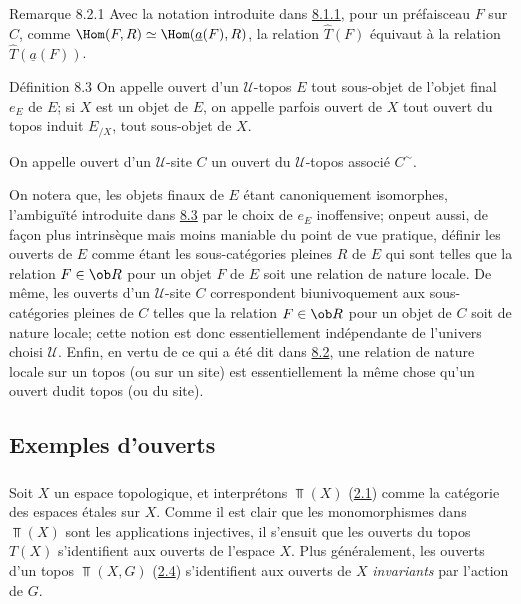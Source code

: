 \begin{enonce*}[remark]{Remarque 8.2.1}
Avec la notation introduite dans \hyperref[IV.rem8.1.1]{8.1.1}, pour un
préfaisceau $F$ sur $C$, comme $\Hom(F,R)\simeq
\Hom(\underline{a}(F),R)$, la relation $\widehat{T}(F)$ équivaut à la
relation $\widehat{T}(\underline{a}(F))$.
\end{enonce*}

\begin{enonce*}{Définition 8.3}
On appelle ouvert d'un $𝒰$-topos $E$ tout sous-objet de
l'objet final $e_E$ de $E$; si $X$ est un objet de $E$, on appelle
parfois ouvert de $X$ tout ouvert du topos induit $E_{/X}$, \ie tout
sous-objet de $X$.

On appelle ouvert d'un $𝒰$-site $C$ un ouvert du
$𝒰$-topos associé $C^{\sim}$.
\end{enonce*}

On notera que, les objets finaux de $E$ étant canoniquement
isomorphes, l'ambiguïté introduite dans \hyperref[IV.def8.3]{8.3} par le choix
de $e_E$ inoffensive; on\pageoriginale peut aussi, de façon plus
intrinsèque mais moins maniable du point de vue pratique, définir
les ouverts de $E$ comme étant les sous-catégories pleines $R$ de
$E$ qui sont telles que la relation $F\in \ob R$ pour un objet $F$
de $E$ soit une relation de nature locale. De même, les ouverts d'un
$𝒰$-site $C$ correspondent biunivoquement aux
sous-catégories pleines de $C$ telles que la relation $F\in \ob R$
pour un objet de $C$ soit de nature locale; cette notion est donc
essentiellement indépendante de l'univers choisi $𝒰$. Enfin,
en vertu de ce qui a été dit dans \hyperref[IV.subsec8.2]{8.2}, une relation
de nature locale sur un topos (ou sur un site) est essentiellement
la même chose qu'un ouvert dudit topos (ou du site).

\setcounter{subsection}{3}
\subsection{Exemples d'ouverts}

\subsubsection{}
Soit $X$ un espace topologique, et interprétons $\Top(X)$
(\hyperref[IV.subsec2.1]{2.1}) comme la catégorie des espaces étales sur $X$.
Comme il est clair que les monomorphismes dans $\Top(X)$ sont les
applications injectives, il s'ensuit que les ouverts du topos $T(X)$
s'identifient aux ouverts de l'espace $X$. Plus généralement, les
ouverts d'un topos $\Top(X,G)$ (\hyperref[IV.subsec2.4]{2.4}) s'identifient
aux ouverts de $X$ \emph{invariants} par l'action de $G$.

